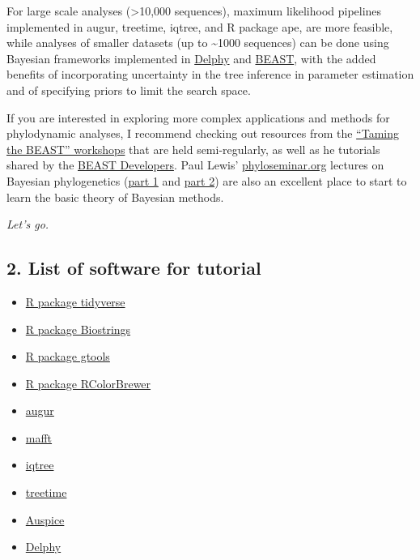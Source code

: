\documentclass[
]{book}
\providecommand{\tightlist}{%
  \setlength{\itemsep}{0pt}\setlength{\parskip}{0pt}}
\begin{document}
For large scale analyses (\textgreater10,000 sequences), maximum likelihood pipelines implemented in augur, treetime, iqtree, and R package ape, are more feasible, while analyses of smaller datasets (up to \textasciitilde1000 sequences) can be done using Bayesian frameworks implemented in \href{https://delphy.fathom.info/}{Delphy} and \href{http://www.beast2.org/}{BEAST}, with the added benefits of incorporating uncertainty in the tree inference in parameter estimation and of specifying priors to limit the search space.

If you are interested in exploring more complex applications and methods for phylodynamic analyses, I recommend checking out resources from the \href{https://taming-the-beast.org/workshops/Taming-the-BEAST-Online/}{``Taming the BEAST'' workshops} that are held semi-regularly, as well as he tutorials shared by the \href{http://www.beast2.org/tutorials/}{BEAST Developers}. Paul Lewis' \href{http://phyloseminar.org/recorded.html}{phyloseminar.org} lectures on Bayesian phylogenetics (\href{https://www.youtube.com/watch?v=4PWlnNsfz90}{part 1} and \href{https://www.youtube.com/watch?v=TLtOS--YwkU}{part 2}) are also an excellent place to start to learn the basic theory of Bayesian methods.

\emph{Let's go.}

\subsection{2. List of software for tutorial}\label{list-of-software-for-tutorial}

\begin{itemize}
\tightlist
\item
  \href{https://tidyverse.org/packages/}{R package tidyverse}
\item
  \href{https://github.com/Bioconductor/Biostrings}{R package Biostrings}
\item
  \href{https://cran.r-project.org/web/packages/gtools/index.html}{R package gtools}
\item
  \href{https://cran.r-project.org/web/packages/RColorBrewer/index.html}{R package RColorBrewer}
\item
  \href{https://docs.nextstrain.org/projects/augur/en/stable/index.html}{augur}
\item
  \href{https://mafft.cbrc.jp/alignment/software/}{mafft}
\item
  \href{http://www.iqtree.org/}{iqtree}
\item
  \href{https://treetime.readthedocs.io/en/latest/}{treetime}
\item
  \href{https://auspice.us/}{Auspice}
\item
  \href{https://delphy.fathom.info/}{Delphy}
\end{itemize}
\end{document}
